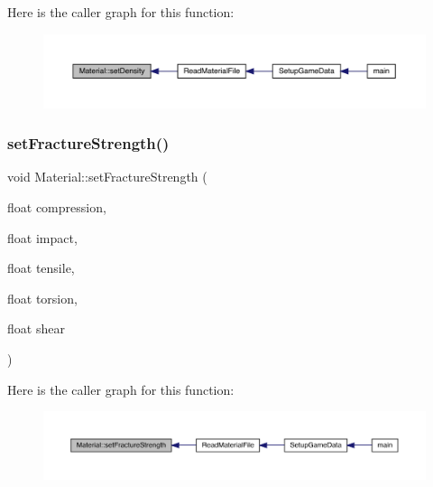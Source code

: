 Here is the caller graph for this function\+:
\nopagebreak
\begin{figure}[H]
\begin{center}
\leavevmode
\includegraphics[width=350pt]{dc/dee/class_material_ab7aca2e9daaf35b5b8a45ee677c07073_icgraph}
\end{center}
\end{figure}
\mbox{\label{class_material_a9c2547bdd4f225f9ad2351b8c2ad7c7e}} 
\subsubsection{\texorpdfstring{set\+Fracture\+Strength()}{setFractureStrength()}}
{\footnotesize\ttfamily void Material\+::set\+Fracture\+Strength (\begin{DoxyParamCaption}\item[{float}]{compression,  }\item[{float}]{impact,  }\item[{float}]{tensile,  }\item[{float}]{torsion,  }\item[{float}]{shear }\end{DoxyParamCaption})}

Here is the caller graph for this function\+:
\nopagebreak
\begin{figure}[H]
\begin{center}
\leavevmode
\includegraphics[width=350pt]{dc/dee/class_material_a9c2547bdd4f225f9ad2351b8c2ad7c7e_icgraph}
\end{center}
\end{figure}
\mbox{\label{class_material_ab73b88e094cf38d28f9addfd12357b04}} 
